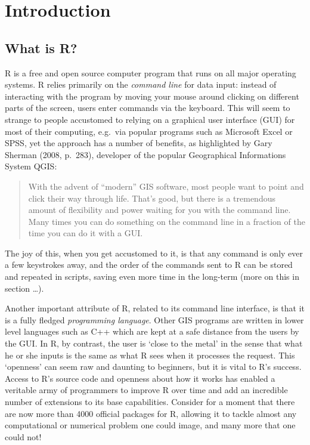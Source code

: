 \documentclass[]{article}
\begin{document}
\section{Introduction}

\subsection{What is R?}

R is a free and open source computer program that runs on all major
operating systems. R relies primarily on the \emph{command line} for
data input: instead of interacting with the program by moving your mouse
around clicking on different parts of the screen, users enter commands
via the keyboard. This will seem to strange to people accustomed to
relying on a graphical user interface (GUI) for most of their computing,
e.g.~via popular programs such as Microsoft Excel or SPSS, yet the
approach has a number of benefits, as highlighted by Gary Sherman (2008,
p.~283), developer of the popular Geographical Informations System QGIS:

\begin{quote}
With the advent of ``modern'' GIS software, most people want to point
and click their way through life. That's good, but there is a tremendous
amount of flexibility and power waiting for you with the command line.
Many times you can do something on the command line in a fraction of the
time you can do it with a GUI.

\end{quote}
The joy of this, when you get accustomed to it, is that any command is
only ever a few keystrokes away, and the order of the commands sent to R
can be stored and repeated in scripts, saving even more time in the
long-term (more on this in section \ldots{}).

Another important attribute of R, related to its command line interface,
is that it is a fully fledged \emph{programming language}. Other GIS
programs are written in lower level languages such as C++ which are kept
at a safe distance from the users by the GUI. In R, by contrast, the
user is `close to the metal' in the sense that what he or she inputs is
the same as what R sees when it processes the request. This `openness'
can seem raw and daunting to beginners, but it is vital to R's success.
Access to R's source code and openness about how it works has enabled a
veritable army of programmers to improve R over time and add an
incredible number of extensions to its base capabilities. Consider for a
moment that there are now more than 4000 official packages for R,
allowing it to tackle almost any computational or numerical problem one
could image, and many more that one could not!
\end{document}

